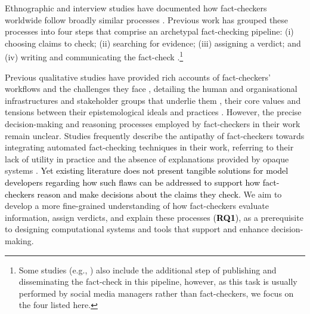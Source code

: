 Ethnographic and interview studies have documented how fact-checkers worldwide follow broadly similar processes \cite{graves2017anatomy,micallef2022true,juneja2022human,koliska2024epistemology}.
Previous work has grouped these processes into four steps that comprise an archetypal fact-checking pipeline: (i) choosing claims to check; (ii) searching for evidence; (iii) assigning a verdict; and (iv) writing and communicating the fact-check \cite{Das2023state,guo2022survey,micallef2022true,juneja2022human}.\footnote{Some studies (e.g., \cite{micallef2022true,juneja2022human}) also include the additional step of publishing and disseminating the fact-check in this pipeline, however, as this task is usually performed by social media managers rather than fact-checkers, we focus on the four listed here.}

Previous qualitative studies have provided rich accounts of fact-checkers' workflows and the challenges they face \cite{micallef2022true}, detailing the human and organisational infrastructures and stakeholder groups that underlie them \cite{juneja2022human}, their core values \cite{dierickx2023automated} and tensions between their epistemological ideals and practices \cite{bengtsson2024rhetoricalfactcheckers}. However, the precise decision-making and reasoning processes employed by fact-checkers in their work remain unclear.
Studies frequently describe the antipathy of fact-checkers towards integrating automated fact-checking techniques in their work, referring to their lack of utility in practice and the absence of explanations provided by opaque systems \cite{micallef2022true,liu2023humancenteredNLP}.
\textcolor{black}{Yet existing literature does not present tangible solutions for model developers regarding how such flaws can be addressed to support how fact-checkers reason and make decisions about the claims they check.}
We aim to develop a more fine-grained understanding of how fact-checkers evaluate information, assign verdicts, and explain these processes \textcolor{black}{(\textbf{RQ1})}, as a prerequisite to designing computational systems and tools that support and enhance decision-making.


